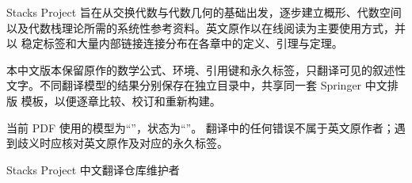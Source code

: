 \preface

Stacks Project 旨在从交换代数与代数几何的基础出发，逐步建立概形、代数空间
以及代数栈理论所需的系统性参考资料。英文原作以在线阅读为主要使用方式，并以
稳定标签和大量内部链接连接分布在各章中的定义、引理与定理。

本中文版本保留原作的数学公式、环境、引用键和永久标签，只翻译可见的叙述性
文字。不同翻译模型的结果分别保存在独立目录中，共享同一套 Springer 中文排版
模板，以便逐章比较、校订和重新构建。

当前 PDF 使用的模型为“\TranslationModelName”，状态为“\TranslationStatus”。
翻译中的任何错误不属于英文原作者；遇到歧义时应核对英文原作及对应的永久标签。

\vspace{\baselineskip}
\begin{flushright}
Stacks Project 中文翻译仓库维护者
\end{flushright}

